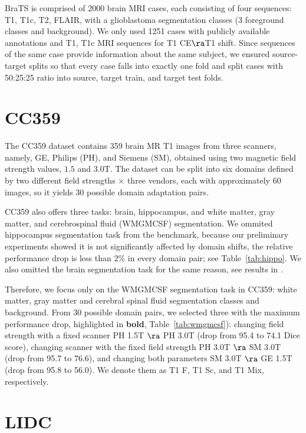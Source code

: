 BraTS \cite{brats} is comprised of 2000 brain MRI cases, each consisting of four sequences: T1, T1c, T2, FLAIR, with a glioblastoma segmentation classes (3 foreground classes and background).  We only used 1251 cases with publicly available annotations and T1, T1c MRI sequences for T1 CE$\ra$T1 shift. Since sequences of the same case provide information about the same subject, we ensured source-target splits so that every case falls into exactly one fold and split cases with 50:25:25 ratio into source, target train, and target test folds.


\section{CC359}

The CC359 dataset \cite{cc359} contains 359 brain MR T1 images from three scanners, namely, GE, Philips (PH), and Siemens (SM), obtained using two magnetic field strength values, $1.5$ and $3.0$T. The dataset can be split into six domains defined by two different field strengths $\times$ three vendors, each with approximately 60 images, so it yields 30 possible domain adaptation pairs. 

CC359 also offers three tasks: brain, hippocampus, and white matter, gray matter, and cerebrospinal fluid (WMGMCSF) segmentation. We ommited hippocampus segmentation task from the benchmark, because our preliminary experiments showed it is not significantly affected by domain shifts, the relative performance drop is less than $2\%$ in every domain pair; see Table~\ref{tab:hippo}. We also omitted the brain segmentation task for the same reason, see results in \cite{shirokikh2020first}.



Therefore, we focus only on the WMGMCSF segmentation task in CC359: white matter, gray matter and cerebral spinal fluid segmentation classes and background. From 30 possible domain pairs, we selected three with the maximum performance drop, highlighted in \textbf{bold},  Table~\ref{tab:wmgmcsf}): changing field strength with a fixed scanner PH 1.5T $\ra$ PH 3.0T (drop from 95.4 to 74.1 Dice score), changing scanner with the fixed field strength PH 3.0T $\ra$ SM 3.0T (drop from 95.7 to 76.6), and changing both parameters SM 3.0T $\ra$ GE 1.5T (drop from 95.8 to 56.0). We denote them as T1 F, T1 Sc, and T1 Mix, respectively.


\section{LIDC}


